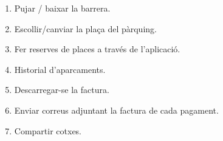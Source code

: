 \begin{slide}
    \begin{enumerate}
        \item Pujar / baixar la barrera.
        \item Escollir/canviar la plaça del pàrquing.
        \item Fer reserves de places a través de l'aplicació.
        \item Historial d'aparcaments.
        \item Descarregar-se la factura.
        \item Enviar correus adjuntant la factura de cada pagament.
        \item Compartir cotxes.
    \end{enumerate}
\end{slide}
